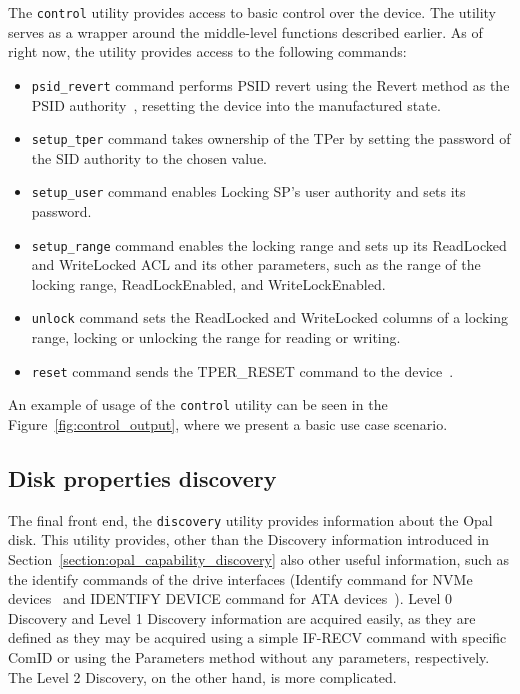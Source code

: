 The \verb|control| utility provides access to basic control over the device.
The utility serves as a wrapper around the middle-level functions described earlier.
As of right now, the utility provides access to the following commands:

\begin{itemize}
    \item \verb|psid_revert| command performs PSID revert using the Revert method as the PSID authority~\cite{tcg-psid}, resetting the device into the manufactured state.
    \item \verb|setup_tper| command takes ownership of the TPer by setting the password of the SID authority to the chosen value.
    \item \verb|setup_user| command enables Locking SP's user authority and sets its password.
    \item \verb|setup_range| command enables the locking range and sets up its ReadLocked and WriteLocked ACL and its other parameters, such as the range of the locking range, ReadLockEnabled, and WriteLockEnabled.
    \item \verb|unlock| command sets the ReadLocked and WriteLocked columns of a locking range, locking or unlocking the range for reading or writing.
    \item \verb|reset| command sends the TPER\_RESET command to the device~\cite{tcg-storage-core}.
\end{itemize}

An example of usage of the \verb|control| utility can be seen in the Figure~\ref{fig:control_output}, where we present a basic use case scenario.

\subsection{Disk properties discovery}
\label{utility_discovery}

The final front end, the \verb|discovery| utility provides information about the Opal disk.
This utility provides, other than the Discovery information introduced in Section~\ref{section:opal_capability_discovery} also other useful information, such as the identify commands of the drive interfaces (Identify command for NVMe devices~\cite{nvme-express-base-specification} and IDENTIFY DEVICE command for ATA devices~\cite{acs-3}).
Level 0 Discovery and Level 1 Discovery information are acquired easily, as they are defined as they may be acquired using a simple IF-RECV command with specific ComID %
or using the Parameters method without any parameters, respectively.
The Level 2 Discovery, on the other hand, is more complicated.

